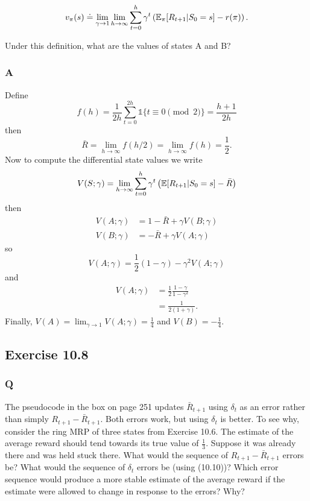 \[
    v_\pi(s) \doteq \lim_{\gamma \to 1} \lim_{h \to \infty} \sum_{t=0}^h \gamma^t \left( \mathbb{E}_{\pi}{}[R_{t+1} \vert{} S_0 = s] - r(\pi) \right).
\]

Under this definition, what are the values of states A and B?
\subsubsection*{A}
Define
\[
    f(h) = \frac{1}{2h} \sum_{t=0}^{2h} \mathds{1}\{t \equiv 0 \pmod 2\} = \frac{h + 1}{2h}
\]
then
\[
    \bar{R} = \lim_{h \to \infty}f(h/2) = \lim_{h \to \infty}f(h) = \frac12.
\]
Now to compute the differential state values we write
\[
    V(S; \gamma) = \lim_{h\to \infty} \sum_{t=0}^h \gamma^t \left( \mathbb{E}{}[R_{t+1} \vert{} S_0 = s] - \bar{R} \right)
\]
then
\begin{align*}
    V(A; \gamma) &= 1 - \bar{R} + \gamma V(B; \gamma) \\ 
    V(B; \gamma) &= - \bar{R} + \gamma V(A; \gamma)
\end{align*}
so
\[
    V(A; \gamma) = \frac12 ( 1 - \gamma ) - \gamma^2 V(A; \gamma)
\]
and
\begin{align*}
    V(A; \gamma) &= \frac12 \frac{1 - \gamma}{1 - \gamma^2} \\
                 &= \frac{1}{2(1 + \gamma)}.
\end{align*}
Finally, $V(A) = \lim_{\gamma \to 1} V(A; \gamma) = \frac14$ and $V(B) = - \frac14$.
    
\subsection{Exercise 10.8}
\subsubsection*{Q}
The pseudocode in the box on page 251 updates $\bar{R}_{t+1}$ using $\delta_t$ as an error rather than simply $R_{t+1} - \bar{R}_{t+1}$. Both errors work, but using $\delta_t$ is better. To see why, consider the ring MRP of three states from Exercise 10.6. The estimate of the average
reward should tend towards its true value of $\frac13$. Suppose it was already there and was held stuck there. What would the sequence of $R_{t+1} - \bar{R}_{t+1}$ errors be? What would the sequence of $\delta_t$ errors be (using (10.10))? Which error sequence would produce a more stable estimate of the average reward if the estimate were allowed to change in response to the errors? Why?
 
